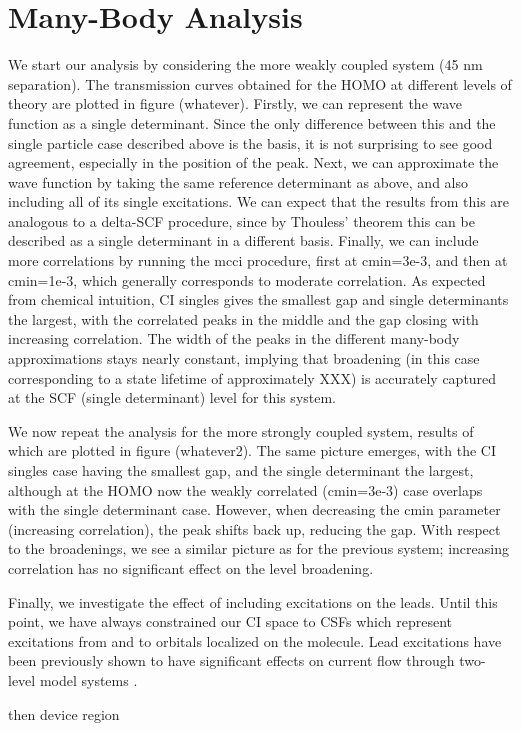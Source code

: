 \section{Many-Body Analysis}

We start our analysis by considering the more weakly coupled system (45
nm separation). The transmission curves obtained for the \ac{HOMO} at
different levels of theory are plotted in figure (whatever). Firstly,
we can represent the wave function as a single determinant. Since the
only difference between this and the single particle case described above
is the basis, it is not surprising to see good agreement, especially in
the position of the peak. Next, we can approximate the wave function by
taking the same reference determinant as above, and also including all
of its single excitations. We can expect that the results from this are
analogous to a delta-SCF procedure, since by Thouless' theorem this can
be described as a single determinant in a different basis. Finally, we
can include more correlations by running the mcci procedure, first at
cmin=3e-3, and then at cmin=1e-3, which generally corresponds to moderate
correlation. As expected from chemical intuition, CI singles gives the
smallest gap and single determinants the largest, with the correlated
peaks in the middle and the gap closing with increasing correlation.
The width of the peaks in the different many-body approximations stays
nearly constant, implying that broadening (in this case corresponding
to a state lifetime of approximately XXX) is accurately captured at the
SCF (single determinant) level for this system.

We now repeat the analysis for the more strongly coupled system, results
of which are plotted in figure (whatever2). The same picture emerges,
with the CI singles case having the smallest gap, and the single determinant
the largest, although at the \ac{HOMO} now the weakly correlated (cmin=3e-3)
case overlaps with the single determinant case. However, when decreasing
the cmin parameter (increasing correlation), the peak shifts back up,
reducing the gap. With respect to the broadenings, we see a similar
picture as for the previous system; increasing correlation has no
significant effect on the level broadening.

Finally, we investigate the effect of including excitations on the leads.
Until this point, we have always constrained our CI space to \acp{CSF}
which represent excitations from and to orbitals localized on the molecule.
Lead excitations have been previously shown to have significant effects
on current flow through two-level model systems
\cite{galperin_nitzan2006leadexcitations}. 

then device region
